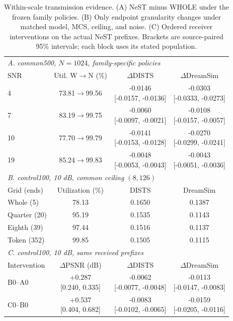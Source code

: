 \begin{table}[t]
\caption{Within-scale transmission evidence. (A) NeST minus WHOLE under the frozen family policies. (B) Only endpoint granularity changes under matched model, MCS, ceiling, and noise. (C) Ordered receiver interventions on the actual NeST prefixes. Brackets are source-paired 95\% intervals; each block uses its stated population.}
\label{tab:internal}\centering\footnotesize
\setlength{\tabcolsep}{2.1pt}\renewcommand{\arraystretch}{1.05}
\begin{tabular}{@{}lccc@{}}\toprule
\multicolumn{4}{l}{\textit{A. common500, $N=1024$, family-specific policies}}\\
SNR & Util. W$\to$N (\%) & $\Delta$DISTS & $\Delta$DreamSim\\
\midrule
4 & 73.81$\to$99.56 & \shortstack{-0.0146\\{}[-0.0157, -0.0136]} & \shortstack{-0.0303\\{}[-0.0333, -0.0273]}\\[2pt]
7 & 83.19$\to$99.75 & \shortstack{-0.0060\\{}[-0.0097, -0.0021]} & \shortstack{-0.0108\\{}[-0.0157, -0.0057]}\\[2pt]
10 & 77.70$\to$99.79 & \shortstack{-0.0141\\{}[-0.0153, -0.0128]} & \shortstack{-0.0270\\{}[-0.0299, -0.0241]}\\[2pt]
19 & 85.24$\to$99.83 & \shortstack{-0.0048\\{}[-0.0053, -0.0043]} & \shortstack{-0.0043\\{}[-0.0051, -0.0036]}\\[2pt]
\midrule
\multicolumn{4}{l}{\textit{B. control100, 10 dB, common ceiling $(8,126)$}}\\
Grid (ends) & Utilization (\%) & DISTS & DreamSim\\
\midrule
Whole (5) & 78.13 & 0.1650 & 0.1387\\
Quarter (20) & 95.19 & 0.1535 & 0.1143\\
Eighth (39) & 97.44 & 0.1516 & 0.1137\\
Token (352) & 99.85 & 0.1505 & 0.1115\\
\midrule
\multicolumn{4}{l}{\textit{C. control100, 10 dB, same received prefixes}}\\
Intervention & $\Delta$PSNR (dB) & $\Delta$DISTS & $\Delta$DreamSim\\
\midrule
B0--A0 & \shortstack{+0.287\\{}[0.240, 0.335]} & \shortstack{-0.0062\\{}[-0.0077, -0.0048]} & \shortstack{-0.0113\\{}[-0.0147, -0.0083]}\\[2pt]
C0--B0 & \shortstack{+0.537\\{}[0.404, 0.682]} & \shortstack{-0.0083\\{}[-0.0102, -0.0065]} & \shortstack{-0.0159\\{}[-0.0205, -0.0116]}\\[2pt]
\bottomrule\end{tabular}\end{table}
